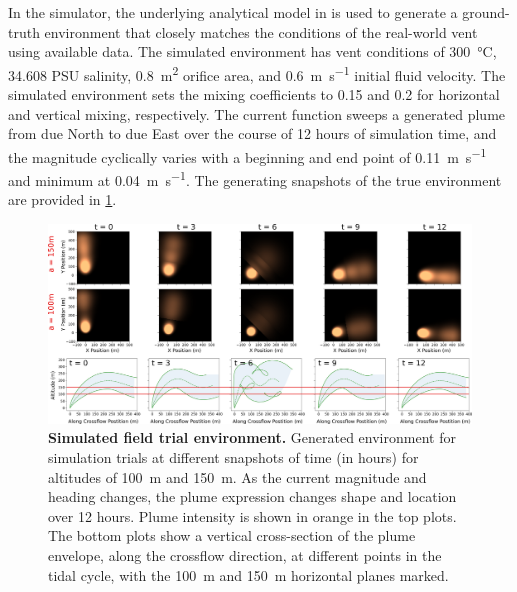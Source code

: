 In the simulator, the underlying analytical model in \PHUMES is used to generate a ground-truth environment that closely matches the conditions of the real-world vent using available data. The simulated environment has vent conditions of \SI{300}{\celsius}, 34.608 PSU salinity, \SI{0.8}{\meter\squared} orifice area, and \SI{0.6}{\meter\per\second} initial fluid velocity. The simulated environment sets the mixing coefficients to 0.15 and 0.2 for horizontal and vertical mixing, respectively. The current function sweeps a generated plume from due North to due East over the course of 12 hours of simulation time, and the magnitude cyclically varies with a beginning and end point of \SI{0.11}{\meter\per\second} and minimum at \SI{0.04}{\meter\per\second}. The generating snapshots of the true environment are provided in \cref{fig:sim_env}.

\begin{figure}
    \centering
    \includegraphics[width=1\columnwidth]{figures/sim_env.png}
    \caption[Simulated field trial environment.]{\textbf{Simulated field trial environment.} Generated environment for simulation trials at different snapshots of time (in hours) for altitudes of \SI{100}{\meter} and \SI{150}{\meter}. As the current magnitude and heading changes, the plume expression changes shape and location over 12 hours. Plume intensity is shown in orange in the top plots. The bottom plots show a vertical cross-section of the plume envelope, along the crossflow direction, at different points in the tidal cycle, with the \SI{100}{\meter} and \SI{150}{\meter} horizontal planes marked.}
    \label{fig:sim_env}
\end{figure}

